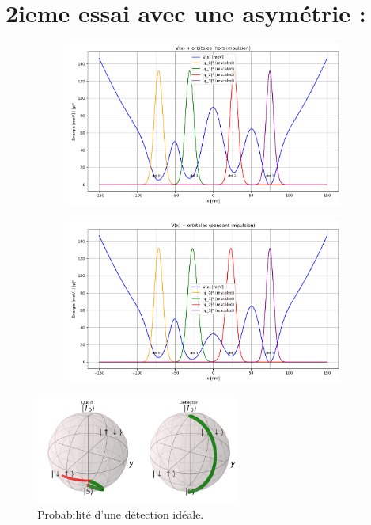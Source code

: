 \documentclass{article}
\begin{document}
\section*{2ieme essai avec une asymétrie :}

\begin{figure}[H]
  \centering
  \begin{subfigure}[c]{0.48\textwidth}
    \centering
    \includegraphics[width=\textwidth]{hors_impulsion_bon.png}
    \label{fig:view_1D_off}
  \end{subfigure}\hfill
  \begin{subfigure}[c]{0.48\textwidth}
    \centering
    \includegraphics[width=\textwidth]{pdt_impulsion_bon.png}
    \label{fig:view_1D_on}
  \end{subfigure}

  \vspace{0.8em}

  \includegraphics[width=0.6\textwidth]{singlet-triplet_du_57_dt_1_2_version1.png}

  \caption{Probabilité d'une détection idéale.}
  \label{fig:fidelity_map_detector}
\end{figure}
\end{document}

